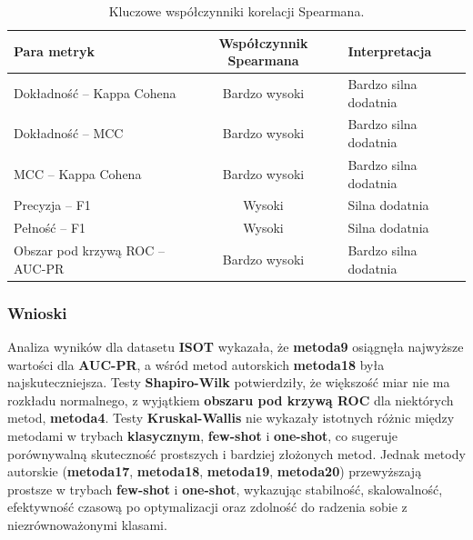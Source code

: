 \begin{table}[H]
	\centering
	\caption{Kluczowe współczynniki korelacji Spearmana.}
	\label{tab:isot_spearman_correlations}
	\begin{tabular}{l c l}
		\toprule
		\textbf{Para metryk}            & \textbf{Współczynnik Spearmana} & \textbf{Interpretacja} \\
		\midrule
		Dokładność -- Kappa Cohena      & Bardzo wysoki                   & Bardzo silna dodatnia  \\
		Dokładność -- MCC               & Bardzo wysoki                   & Bardzo silna dodatnia  \\
		MCC -- Kappa Cohena             & Bardzo wysoki                   & Bardzo silna dodatnia  \\
		Precyzja -- F1                  & Wysoki                          & Silna dodatnia         \\
		Pełność -- F1                   & Wysoki                          & Silna dodatnia         \\
		Obszar pod krzywą ROC -- AUC-PR & Bardzo wysoki                   & Bardzo silna dodatnia  \\
		\bottomrule
	\end{tabular}
\end{table}

\subsubsection{Wnioski}

Analiza wyników dla datasetu \textbf{ISOT} wykazała, że \textbf{metoda9} osiągnęła najwyższe wartości dla \textbf{AUC-PR}, a wśród metod autorskich \textbf{metoda18} była najskuteczniejsza. Testy \textbf{Shapiro-Wilk} potwierdziły, że większość miar nie ma rozkładu normalnego, z wyjątkiem \textbf{obszaru pod krzywą ROC} dla niektórych metod, \textbf{metoda4}. Testy \textbf{Kruskal-Wallis} nie wykazały istotnych różnic między metodami w trybach \textbf{klasycznym}, \textbf{few-shot} i \textbf{one-shot}, co sugeruje porównywalną skuteczność prostszych i bardziej złożonych metod. Jednak metody autorskie (\textbf{metoda17}, \textbf{metoda18}, \textbf{metoda19}, \textbf{metoda20}) przewyższają prostsze w trybach \textbf{few-shot} i \textbf{one-shot}, wykazując stabilność, skalowalność, efektywność czasową po optymalizacji oraz zdolność do radzenia sobie z niezrównoważonymi klasami.